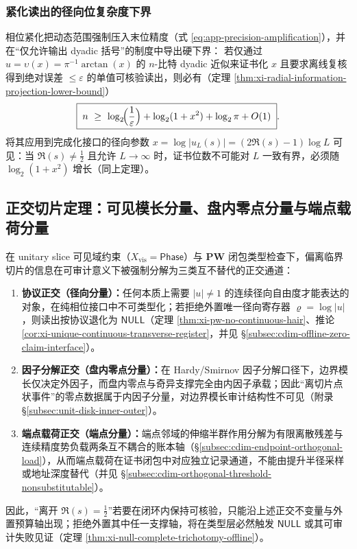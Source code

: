 \subsubsection{紧化读出的径向位复杂度下界}
相位紧化把动态范围强制压入末位精度（式 \eqref{eq:app-precision-amplification}），并在“仅允许输出 dyadic 括号”的制度中导出硬下界：
若仅通过 \(u=\upsilon(x)=\pi^{-1}\arctan(x)\) 的 \(n\)-比特 dyadic 近似来证书化 \(x\) 且要求离线复核得到绝对误差 \(\le\varepsilon\) 的单值可核验读出，则必有（定理 \ref{thm:xi-radial-information-projection-lower-bound}）
\[
\boxed{\;
n\ \ge\ \log_2\!\Bigl(\frac{1}{\varepsilon}\Bigr)+\log_2(1+x^2)+\log_2\pi+O(1)\; }.
\]
将其应用到完成化接口的径向参数 \(x=\log|u_L(s)|=(2\Re(s)-1)\log L\) 可见：当 \(\Re(s)\neq\tfrac12\) 且允许 \(L\to\infty\) 时，证书位数不可能对 \(L\) 一致有界，必须随 \(\log_2(1+x^2)\) 增长（同上定理）。

\subsection{正交切片定理：可见模长分量、盘内零点分量与端点载荷分量}\label{subsec:cdim-orthogonal-slice-theorem}
在 unitary slice 可见域约束（\(X_{\mathrm{vis}}=\mathsf{Phase}\)）与 \(\mathbf{PW}\) 闭包类型检查下，偏离临界切片的信息在可审计意义下被强制分解为三类互不替代的正交通道：
\begin{enumerate}
  \item \textbf{协议正交（径向分量）：}任何本质上需要 \(|u|\neq 1\) 的连续径向自由度才能表达的对象，在纯相位接口中不可类型化；若拒绝外置唯一径向寄存器 \(\varrho=\log|u|\)，则读出按协议退化为 \(\mathsf{NULL}\)（定理 \ref{thm:xi-pw-no-continuous-hair}、推论 \ref{cor:xi-unique-continuous-transverse-register}，并见 \S\ref{subsec:cdim-offline-zero-claim-interface}）。
  \item \textbf{因子分解正交（盘内零点分量）：}在 Hardy/Smirnov 因子分解口径下，边界模长仅决定外因子，而盘内零点与奇异支撑完全由内因子承载；因此“离切片点状事件”的零点数据属于内因子分量，对边界模长审计结构性不可见（附录 \S\ref{subsec:unit-disk-inner-outer}）。
  \item \textbf{端点载荷正交（端点分量）：}端点邻域的伸缩半群作用分解为有限离散残差与连续精度势负载两条互不耦合的账本轴（\S\ref{subsec:cdim-endpoint-orthogonal-load}），从而端点载荷在证书闭包中对应独立记录通道，不能由提升半径采样或地址深度替代（并见 \S\ref{subsec:cdim-orthogonal-threshold-nonsubstitutable}）。
\end{enumerate}
因此，“离开 \(\Re(s)=\tfrac12\)”若要在闭环内保持可核验，只能沿上述正交不变量与外置预算轴出现；拒绝外置其中任一支撑轴，将在类型层必然触发 \(\mathsf{NULL}\) 或其可审计失败见证（定理 \ref{thm:xi-null-complete-trichotomy-offline}）。

\endinput
